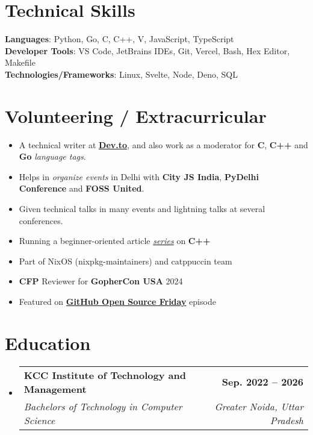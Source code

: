 \documentclass[letterpaper,11pt]{article}
\makeatletter
\newcommand{\resumeItem}[1]{
  \item\small{
    {#1 \vspace{-2pt}}
  }
}
\newcommand{\resumeSubheading}[4]{
  \vspace{-2pt}\item
    \begin{tabular*}{1.0\textwidth}[t]{l@{\extracolsep{\fill}}r}
      \textbf{#1} & \textbf{\small #2} \\
      \textit{\small#3} & \textit{\small #4} \\
    \end{tabular*}\vspace{-7pt}
}
\newcommand{\resumeSubHeadingListStart}{\begin{itemize}[leftmargin=0.0in, label={}]}
\newcommand{\resumeSubHeadingListEnd}{\end{itemize}}
\newcommand{\resumeItemListStart}{\begin{itemize}}
\newcommand{\resumeItemListEnd}{\end{itemize}\vspace{-5pt}}
\makeatother
\begin{document}
%
\section{Technical Skills}
 \begin{itemize}[leftmargin=0.15in, label={}]
    \small{\item{
     \textbf{Languages}{: Python, Go, C, C++, V, JavaScript, TypeScript} \\
     \textbf{Developer Tools}{: VS Code, JetBrains IDEs, Git, Vercel, Bash, Hex Editor, Makefile} \\
     \textbf{Technologies/Frameworks}{: Linux, Svelte, Node, Deno, SQL} \\
    }}
 \end{itemize}
 \vspace{-16pt}


\section{Volunteering / Extracurricular}
            \resumeItemListStart
                \resumeItem{A technical writer at \href{https://dev.to/delta456}{\textbf{Dev.to}}, and also work as a moderator for \textbf{C}, \textbf{C++} and \textbf{Go} \textit{language tags}.}
                \resumeItem{Helps in \textit{organize events} in Delhi with \textbf{City JS India}, \textbf{PyDelhi Conference} and \textbf{FOSS United}.}
                \resumeItem{Given technical talks in many events and lightning talks at several conferences.}
                \resumeItem{Running a beginner-oriented article \textit{\href{https://github.com/Delta456/modern_cpp_series}{series}} on \textbf{C++}}
                \resumeItem{Part of NixOS (nixpkg-maintainers) and catppuccin team}
                \resumeItem{\textbf{CFP} Reviewer for \textbf{GopherCon USA} 2024}
                \resumeItem{Featured on \textbf{\href{https://www.youtube.com/watch?v=gs8FFp0rAbk}{GitHub Open Source Friday}} episode}
            \resumeItemListEnd

            
\section{Education}
  \resumeSubHeadingListStart
    \resumeSubheading
      {KCC Institute of Technology and Management}{Sep. 2022 -- 2026}
      {Bachelors of Technology in Computer Science}{Greater Noida, Uttar Pradesh}
  \resumeSubHeadingListEnd
\end{document}
